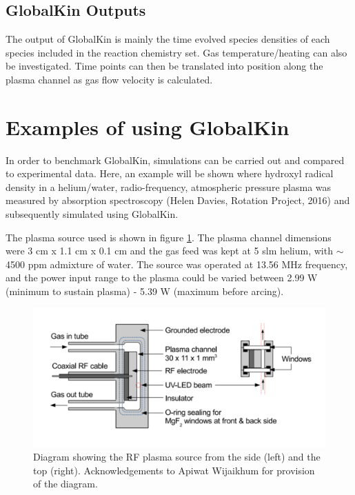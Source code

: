 \documentclass[11pt, oneside]{article}   	%
\begin{document}
\subsection{GlobalKin Outputs}
The output of GlobalKin is mainly the time evolved species densities of each species included in the reaction chemistry set.
Gas temperature/heating can also be investigated.
Time points can then be translated into position along the plasma channel as gas flow velocity is calculated.

\section{Examples of using GlobalKin}
In order to benchmark GlobalKin, simulations can be carried out and compared to experimental data.
Here, an example will be shown where hydroxyl radical density in a helium/water, radio-frequency, atmospheric pressure plasma was measured by absorption spectroscopy (Helen Davies, Rotation Project, 2016) and subsequently simulated using GlobalKin.

The plasma source used is shown in figure \ref{PlasmafromApiwat}.
The plasma channel dimensions were 3 cm x 1.1 cm x 0.1 cm and the gas feed was kept at 5 slm helium, with $\sim$ 4500 ppm admixture of water.
The source was operated at 13.56 MHz frequency, and the power input range to the plasma could be varied between 2.99 W (minimum to sustain plasma) - 5.39 W (maximum before arcing).

\begin{figure}
\includegraphics[width=\textwidth]{Figures/PlasmafromApiwat}
\caption{Diagram showing the RF plasma source from the side (left) and the top (right). Acknowledgements to Apiwat Wijaikhum for provision of the diagram.}
\label{PlasmafromApiwat}
\end{figure}
\end{document}
